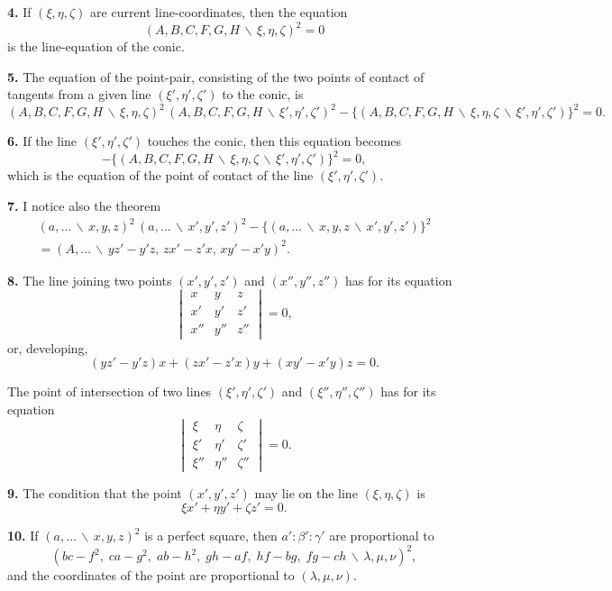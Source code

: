 \documentclass[11pt,a4paper]{book}
\begin{document}
\textbf{4.} If $(\xi,\eta,\zeta)$ are current line-coordinates, then the equation
\[(A,B,C,F,G,H\,\backslash\!\!\,\xi,\eta,\zeta)^{2} = 0\]
is the line-equation of the conic.

\textbf{5.} The equation of the point-pair, consisting of the two points of contact of
tangents from a given line $(\xi',\eta',\zeta')$ to the conic, is
\[(A,B,C,F,G,H\,\backslash\!\!\,\xi,\eta,\zeta)^{2}\,(A,B,C,F,G,H\,\backslash\!\!\,\xi',\eta',\zeta')^{2}
- \{(A,B,C,F,G,H\,\backslash\!\!\,\xi,\eta,\zeta\,\backslash\!\!\,\xi',\eta',\zeta')\}^{2} = 0.\]

\textbf{6.} If the line $(\xi',\eta',\zeta')$ touches the conic, then this equation becomes
\[-\{(A,B,C,F,G,H\,\backslash\!\!\,\xi,\eta,\zeta\,\backslash\!\!\,\xi',\eta',\zeta')\}^{2} = 0,\]
which is the equation of the point of contact of the line $(\xi',\eta',\zeta')$.

\newpage

\textbf{7.} I notice also the theorem
\begin{multline*}
(a,\ldots\,\backslash\!\!\,x,y,z)^{2}\,(a,\ldots\,\backslash\!\!\,x',y',z')^{2}
- \{(a,\ldots\,\backslash\!\!\,x,y,z\,\backslash\!\!\,x',y',z')\}^{2} \\
= (A,\ldots\,\backslash\!\!\,yz'-y'z,\, zx'-z'x,\, xy'-x'y)^{2}.
\end{multline*}

\textbf{8.} The line joining two points $(x',y',z')$ and $(x'',y'',z'')$ has for its equation
\[
\begin{vmatrix}
x & y & z \\
x' & y' & z' \\
x'' & y'' & z''
\end{vmatrix}
= 0,\]
or, developing,
\[(yz'-y'z)x + (zx'-z'x)y + (xy'-x'y)z = 0.\]

The point of intersection of two lines $(\xi',\eta',\zeta')$ and $(\xi'',\eta'',\zeta'')$ has
for its equation
\[
\begin{vmatrix}
\xi & \eta & \zeta \\
\xi' & \eta' & \zeta' \\
\xi'' & \eta'' & \zeta''
\end{vmatrix}
= 0.\]

\textbf{9.} The condition that the point $(x',y',z')$ may lie on the line $(\xi,\eta,\zeta)$ is
\[\xi x' + \eta y' + \zeta z' = 0.\]

\textbf{10.} If $(a,\ldots\,\backslash\!\!\,x,y,z)^{2}$ is a perfect square, then
$a':\beta':\gamma'$ are proportional to
\[(bc-f^{2},\; ca-g^{2},\; ab-h^{2},\; gh-af,\; hf-bg,\; fg-ch\,\backslash\!\!\,\lambda,\mu,\nu)^{2},\]
and the coordinates of the point are proportional to $(\lambda,\mu,\nu)$.
\end{document}
